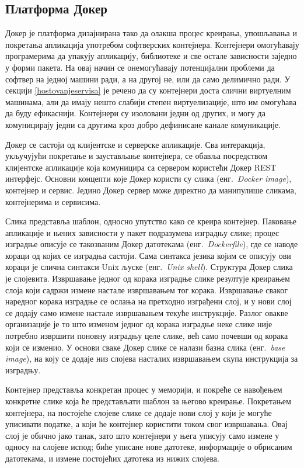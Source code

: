 \documentclass[12pt,oneside]{memoir}
\begin{document}
\subsection{Платформа Докер}
Докер је платформа дизајнирана тако да олакша процес креирања, упошљавања и покретања апликација употребом софтверских контејнера. Контејнери омогућавају програмерима да упакују апликацију, библиотеке и све остале зависности заједно у форми пакета. На овај начин се онемогућавају потенцијални проблеми да софтвер на једној машини ради, а на другој не, или да само делимично ради. У секцији \ref{hostovanjeservisa} је речено да су контејнери доста слични виртуелним машинама, али да имају нешто слабији степен виртуелизације, што им омогућава да буду ефикаснији. Контејнери су изоловани једни од других, и могу да комуницирају једни са другима кроз добро дефинисане канале комуникације.

Докер се састоји од клијентске и серверске апликације. Сва интеракција, укључујући покретање и заустављање контејнера, се обавља посредством клијентске апликације која комуницира са сервером користећи Докер REST интерфејс. Основни концепти које Докер користи су слика (енг.~\textit{Docker image}), контејнер и сервис. Једино Докер сервер може директно да манипулише сликама, контејнерима и сервисима.

Слика представља шаблон, односно упутство како се креира контејнер. Паковање апликације и њених зависности у пакет подразумева изградњу слике; процес изградње описује се такозваним Докер датотекама (енг.~\textit{Dockerfile}), где се наводе кораци од којих се изградња састоји. Сама синтакса језика којим се описују ови кораци је слична синтакси Unix љуске (енг.~\textit{Unix shell}). Структура Докер слика је слојевита. Извршавање једног од корака изградње слике резултује креирањем слоја који садржи измене настале извршавањем тог корака. Извршавање сваког наредног корака изградње се ослања на претходно изграђени слој, и у нови слој се додају само измене настале извршавањем текуће инструкције. Разлог овакве организације је то што изменом једног од корака изградње неке слике није потребно извршити поновну изградњу целе слике, већ само почевши од корака који се изменио. У основи сваке Докер слике се налази базна слика (енг.~\textit{base image}), на коју се додаје низ слојева насталих извршавањем скупа инструкција за изградњу.

Контејнер представља конкретан процес у меморији, и покреће се навођењем конкретне слике која ће представљати шаблон за његово креирање. Покретањем контејнера, на постојеће слојеве слике се додаје нови слој у који је могуће уписивати податке, а који ће контејнер користити током свог извршавања. Овај слој је обично јако танак, зато што контејнери у њега уписују само измене у односу на слојеве испод; биће уписане нове датотеке, информације о обрисаним датотекама, и измене постојећих датотека из нижих слојева.
\end{document}
